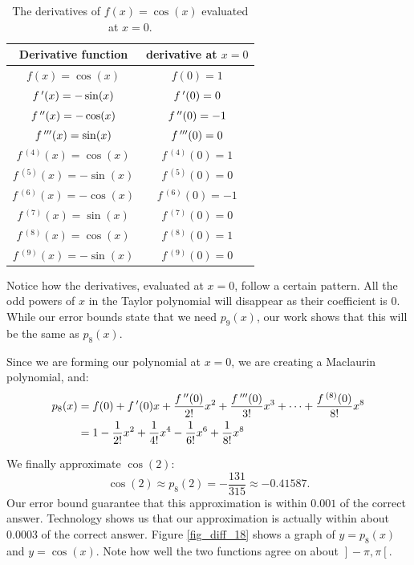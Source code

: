 \begin{example}
\begin{table}[H]
\caption{The derivatives of $f(x)=\cos(x)$ evaluated at $x=0$.}
\label{tab_series_2}
\renewcommand{\arraystretch}{1.5}
\begin{tabular}{c|c}
Derivative function&derivative at $x=0$\\\hline
$f(x) = \cos (x) $&$f(0) = 1$\\
$f\,'(x) = -\sin (x) $&$f\,'(0) = 0$\\
$f\,''(x) = -\cos (x) $&$f\,''(0) = -1$\\
$f\,'''(x) = \sin (x) $&$f\,'''(0) = 0$\\
$f\,^{(4)}(x) = \cos (x) $&$f\,^{(4)}(0) = 1$\\
$f\,^{(5)}(x) = -\sin (x) $&$f\,^{(5)}(0) = 0$\\
$f\,^{(6)}(x) = -\cos (x) $&$f\,^{(6)}(0) = -1$\\
$f\,^{(7)}(x) = \sin (x) $&$f\,^{(7)}(0) = 0$\\
$f\,^{(8)}(x) = \cos (x) $&$f\,^{(8)}(0) = 1$\\
$f\,^{(9)}(x) = -\sin (x) $&$f\,^{(9)}(0) = 0$\\
\end{tabular}
\renewcommand{\arraystretch}{1}
\end{table}


Notice how the derivatives, evaluated at $x=0$, follow a certain pattern. All the odd powers of $x$ in the Taylor polynomial will disappear as their coefficient is 0. While our error bounds state that we need $p_9(x)$, our work shows that this will be the same as $p_8(x)$. 

Since we are forming our polynomial at $x=0$, we are creating a Maclaurin polynomial, and:
\begin{align*}
p_8(x) &= f(0) + f\,'(0)x + \frac{f\,''(0)}{2!}x^2 + \frac{f\,'''(0)}{3!}x^3 + \cdots +\frac{f\,^{(8)}(0)}{8!}x^8\\
		&=  1-\frac{1}{2!}x^2+\frac{1}{4!}x^4-\frac{1}{6!}x^6+\frac{1}{8!}x^8
\end{align*}

We finally approximate $\cos(2)$:
$$\cos(2) \approx p_8(2) = -\frac{131}{315} \approx -0.41587.$$ Our error bound guarantee that this approximation is within $0.001$ of the correct answer. Technology shows us that our approximation is actually within about $0.0003$ of the correct answer.
Figure \ref{fig_diff_18} shows a graph of $y=p_8(x)$ and $y=\cos(x)$. Note how well the two functions agree on about $\left.\right]-\pi,\pi\left[\right.$.



\end{example}

